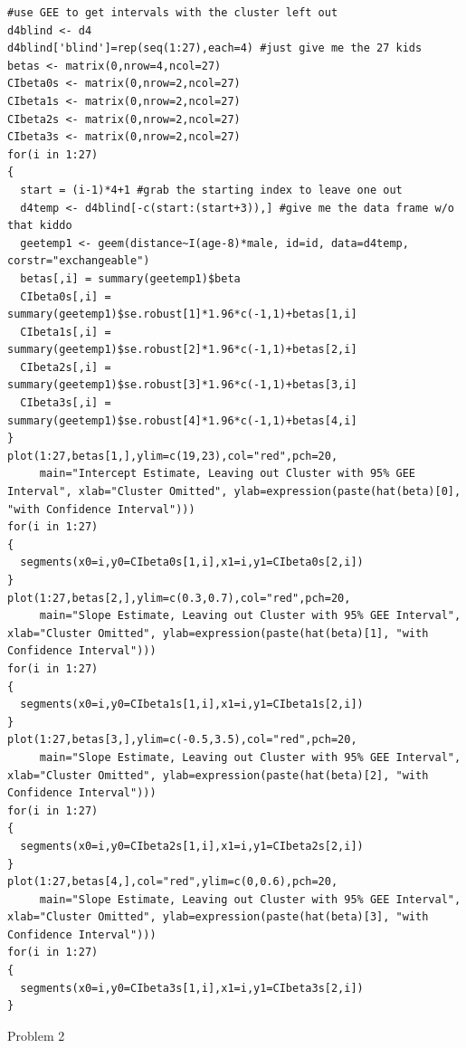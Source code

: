 \documentclass[11pt]{article}
\begin{document}
\begin{verbatim}
#use GEE to get intervals with the cluster left out
d4blind <- d4
d4blind['blind']=rep(seq(1:27),each=4) #just give me the 27 kids
betas <- matrix(0,nrow=4,ncol=27)
CIbeta0s <- matrix(0,nrow=2,ncol=27)
CIbeta1s <- matrix(0,nrow=2,ncol=27)
CIbeta2s <- matrix(0,nrow=2,ncol=27)
CIbeta3s <- matrix(0,nrow=2,ncol=27)
for(i in 1:27)
{
  start = (i-1)*4+1 #grab the starting index to leave one out
  d4temp <- d4blind[-c(start:(start+3)),] #give me the data frame w/o that kiddo
  geetemp1 <- geem(distance~I(age-8)*male, id=id, data=d4temp, corstr="exchangeable")
  betas[,i] = summary(geetemp1)$beta
  CIbeta0s[,i] = summary(geetemp1)$se.robust[1]*1.96*c(-1,1)+betas[1,i]
  CIbeta1s[,i] = summary(geetemp1)$se.robust[2]*1.96*c(-1,1)+betas[2,i]
  CIbeta2s[,i] = summary(geetemp1)$se.robust[3]*1.96*c(-1,1)+betas[3,i]
  CIbeta3s[,i] = summary(geetemp1)$se.robust[4]*1.96*c(-1,1)+betas[4,i]
}
plot(1:27,betas[1,],ylim=c(19,23),col="red",pch=20,
     main="Intercept Estimate, Leaving out Cluster with 95% GEE Interval", xlab="Cluster Omitted", ylab=expression(paste(hat(beta)[0], "with Confidence Interval")))
for(i in 1:27)
{
  segments(x0=i,y0=CIbeta0s[1,i],x1=i,y1=CIbeta0s[2,i])
}
plot(1:27,betas[2,],ylim=c(0.3,0.7),col="red",pch=20,
     main="Slope Estimate, Leaving out Cluster with 95% GEE Interval", xlab="Cluster Omitted", ylab=expression(paste(hat(beta)[1], "with Confidence Interval")))
for(i in 1:27)
{
  segments(x0=i,y0=CIbeta1s[1,i],x1=i,y1=CIbeta1s[2,i])
}
plot(1:27,betas[3,],ylim=c(-0.5,3.5),col="red",pch=20,
     main="Slope Estimate, Leaving out Cluster with 95% GEE Interval", xlab="Cluster Omitted", ylab=expression(paste(hat(beta)[2], "with Confidence Interval")))
for(i in 1:27)
{
  segments(x0=i,y0=CIbeta2s[1,i],x1=i,y1=CIbeta2s[2,i])
}
plot(1:27,betas[4,],col="red",ylim=c(0,0.6),pch=20,
     main="Slope Estimate, Leaving out Cluster with 95% GEE Interval", xlab="Cluster Omitted", ylab=expression(paste(hat(beta)[3], "with Confidence Interval")))
for(i in 1:27)
{
  segments(x0=i,y0=CIbeta3s[1,i],x1=i,y1=CIbeta3s[2,i])
}
\end{verbatim}
\newpage
Problem 2
\end{document}
